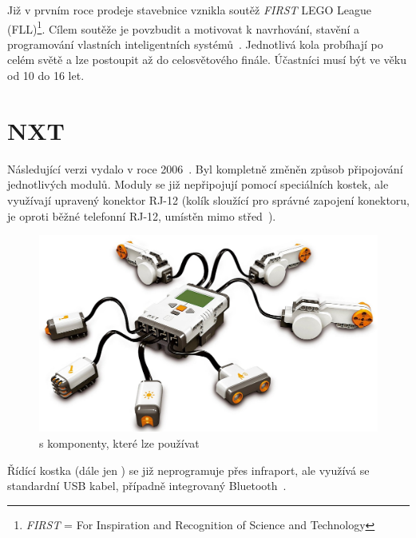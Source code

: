 Již v prvním roce prodeje stavebnice vznikla soutěž {\it FIRST} LEGO League (FLL)\footnote{{\it FIRST} = For Inspiration and Recognition of Science and Technology}. 
Cílem soutěže je povzbudit a motivovat k navrhování, stavění a programování vlastních inteligentních systémů~\cite{lego_FLL-about}. 
Jednotlivá kola probíhají po celém světě a lze postoupit až do celosvětového finále. %
Účastníci musí být ve věku od 10 do 16 let. 


\section{\legoM{ }NXT}

Následující verzi vydalo \lego{ }v roce 2006~\cite{lego_mindstormsHistory}. 
Byl kompletně změněn způsob připojování jednotlivých modulů. 
Moduly se již nepřipojují pomocí speciálních \lego{ }kostek, ale využívají upravený konektor RJ-12 %
(kolík sloužící pro správné zapojení konektoru, je oproti běžné telefonní RJ-12, umístěn mimo střed~\cite{legoMindstorms_rj12-connector}). %

\begin{figure}[h]
	\centering
	\includegraphics[width=\textwidth]{images/lego-mindstorms-nxt_with-modules.jpg}
	\caption[\legoNXT{ }s komponenty, které lze používat]{\legoNXT{ }s komponenty, které lze používat\protect\footnotemark}
	\label{fig:lego-mindstorms-nxt_with-modules}
\end{figure}

Řídící kostka (dále jen \brick{}) %
se již neprogramuje přes infraport, ale využívá se standardní USB kabel, případně integrovaný Bluetooth~\cite{legoMindstormsNXT_hardware}.

